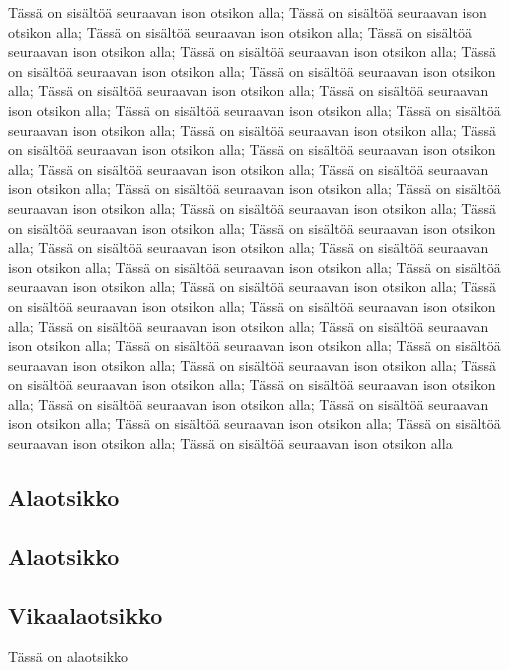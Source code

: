 \documentclass[a4paper]{article}
\begin{document}
Tässä on sisältöä seuraavan ison otsikon alla; Tässä on sisältöä seuraavan ison otsikon alla; Tässä on sisältöä seuraavan ison otsikon alla; Tässä on sisältöä seuraavan ison otsikon alla; Tässä on sisältöä seuraavan ison otsikon alla; Tässä on sisältöä seuraavan ison otsikon alla; Tässä on sisältöä seuraavan ison otsikon alla; Tässä on sisältöä seuraavan ison otsikon alla; Tässä on sisältöä seuraavan ison otsikon alla; Tässä on sisältöä seuraavan ison otsikon alla; Tässä on sisältöä seuraavan ison otsikon alla; Tässä on sisältöä seuraavan ison otsikon alla; Tässä on sisältöä seuraavan ison otsikon alla; Tässä on sisältöä seuraavan ison otsikon alla; Tässä on sisältöä seuraavan ison otsikon alla; Tässä on sisältöä seuraavan ison otsikon alla; Tässä on sisältöä seuraavan ison otsikon alla; Tässä on sisältöä seuraavan ison otsikon alla; Tässä on sisältöä seuraavan ison otsikon alla; Tässä on sisältöä seuraavan ison otsikon alla; Tässä on sisältöä seuraavan ison otsikon alla; Tässä on sisältöä seuraavan ison otsikon alla; Tässä on sisältöä seuraavan ison otsikon alla; Tässä on sisältöä seuraavan ison otsikon alla; Tässä on sisältöä seuraavan ison otsikon alla; Tässä on sisältöä seuraavan ison otsikon alla; Tässä on sisältöä seuraavan ison otsikon alla; Tässä on sisältöä seuraavan ison otsikon alla; Tässä on sisältöä seuraavan ison otsikon alla; Tässä on sisältöä seuraavan ison otsikon alla; Tässä on sisältöä seuraavan ison otsikon alla; Tässä on sisältöä seuraavan ison otsikon alla; Tässä on sisältöä seuraavan ison otsikon alla; Tässä on sisältöä seuraavan ison otsikon alla; Tässä on sisältöä seuraavan ison otsikon alla; Tässä on sisältöä seuraavan ison otsikon alla; Tässä on sisältöä seuraavan ison otsikon alla; Tässä on sisältöä seuraavan ison otsikon alla; Tässä on sisältöä seuraavan ison otsikon alla; Tässä on sisältöä seuraavan ison otsikon alla

\subsection{Alaotsikko}

\subsection{Alaotsikko}

\subsection{Vikaalaotsikko}



Tässä on alaotsikko

\citep{janne2012}




\end{document}
